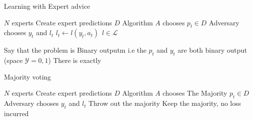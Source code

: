 \begin{algorithm}[H]
    \caption{Learning with Expert advice}
    \begin{algorithmic}[1]
        \Require $N$ experts
            \State Create expert predictions $D$
            \State Algorithm $A$ chooses $p_t \in D$
            \State Adversary chooses $y_t$ and $l_t$
            \State $l_t \gets l(y_t, a_t) \ \ l \in \mathcal{L}$ 
        \EndFor
    \end{algorithmic}
\end{algorithm}

Say that the problem is Binary outputm i.e the $p_t$ and $y_t$ are both binary output (space $\mathcal{Y} = {0,1}$)
There is exactly

\begin{algorithm}[H]
    \caption{Majority voting}
    \begin{algorithmic}[1]
        \Require $N$ experts
            \State Create expert predictions $D$
            \State Algorithm $A$ chooses The Majority $p_t \in D$
            \State Adversary chooses $y_t$ and $l_t$
                \State Throw out the majority
            \Else
                \State Keep the majority, no loss incurred
            \EndIf


        \EndFor
    \end{algorithmic}
\end{algorithm}